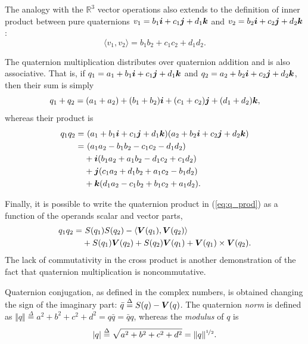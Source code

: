 The analogy with the $\mathbb{R}^3$ vector operations also extends to the definition of inner product between pure quaternions $v_1 = b_1\boldsymbol{i} + c_1\boldsymbol{j} + d_1\boldsymbol{k}$ and $v_2 = b_2\boldsymbol{i} + c_2\boldsymbol{j} + d_2\boldsymbol{k}$:
\begin{equation}
    \langle v_1, v_2 \rangle =
    b_1 b_2 + c_1 c_2 + d_1 d_2.
\end{equation}

The quaternion multiplication distributes over quaternion addition
and is also associative. That is, if $q_1 = a_1 + b_1\boldsymbol{i} + c_1\boldsymbol{j} + d_1\boldsymbol{k}$ and $q_2 = a_2 +  b_2\boldsymbol{i} + c_2\boldsymbol{j} + d_2\boldsymbol{k}$, then their sum is simply
\begin{equation}
    q_1 + q_2 = (a_1 + a_2) + (b_1 + b_2)\boldsymbol{i} + (c_1 + c_2)\boldsymbol{j} + (d_1 + d_2)\boldsymbol{k},
\end{equation}
whereas their product is
\begin{equation}
    \label{eq:q_prod}
    \begin{aligned}
        q_1 q_2 = & \ (a_1 + b_1\boldsymbol{i} + c_1\boldsymbol{j} + d_1\boldsymbol{k}) (a_2 +  b_2\boldsymbol{i} + c_2\boldsymbol{j} + d_2\boldsymbol{k}) \\
        =         & \ (a_1 a_2 - b_1 b_2 - c_1 c_2 - d_1 d_2)                            \\
                  & + \boldsymbol{i} (b_1 a_2 + a_1 b_2 - d_1 c_2 + c_1 d_2)                        \\
                  & + \boldsymbol{j} (c_1 a_2 + d_1 b_2 + a_1 c_2 - b_1 d_2)                        \\
                  & + \boldsymbol{k} (d_1 a_2 - c_1 b_2 + b_1 c_2 + a_1 d_2).
    \end{aligned}
\end{equation}

Finally, it is possible to write the quaternion product in (\ref{eq:q_prod}) as a function of the operands scalar and vector parts,
\begin{equation}
    \label{eq:prod_vectors}
    \begin{aligned}
        q_1 q_2 = & \ S(q_1)S(q_2) - \langle\boldsymbol{V}(q_1), \boldsymbol{V}(q_2)\rangle              \\
                  & + S(q_1) \boldsymbol{V}(q_2) + S(q_2)\boldsymbol{V}(q_1) + \boldsymbol{V}(q_1) \times \boldsymbol{V}(q_2).
    \end{aligned}
\end{equation}
The lack of commutativity in the cross product is another demonstration of the fact that quaternion multiplication is noncommutative.

Quaternion conjugation, as defined in the complex numbers, is obtained changing the sign of the imaginary part: $ \bar{q} \overset{\Delta}{=} S(q) - \boldsymbol{V}(q) $. The quaternion \textit{norm} is defined as $\Vert q \Vert \overset{\Delta}{=} a^2 + b^2 + c^2 + d^2 = q \bar{q} = \bar{q} q$, whereas the \textit{modulus} of $q$ \cite{ell2014quaternion} is
\begin{equation}
    \label{eq:modulusq}
    |q| \overset{\Delta}{=} \sqrt{a^2 + b^2 + c^2 + d^2} = \Vert q \Vert^{\nicefrac{1}{2}}.
\end{equation}

